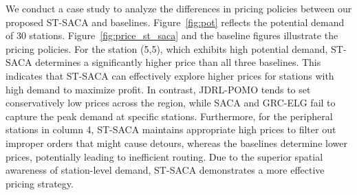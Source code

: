 \documentclass[lettersize,journal]{IEEEtran}
\begin{document}
\color{blue}

We conduct a case study to analyze the differences in pricing policies between our proposed ST-SACA and baselines. Figure~\ref{fig:pot} reflects the potential demand of 30 stations. Figure~\ref{fig:price_st_saca} and the baseline figures illustrate the pricing policies. For the station (5,5), which exhibits high potential demand, ST-SACA determines a significantly higher price than all three baselines. This indicates that ST-SACA can effectively explore higher prices for stations with high demand to maximize profit. In contrast, JDRL-POMO tends to set conservatively low prices across the region, while SACA and GRC-ELG fail to capture the peak demand at specific stations. Furthermore, for the peripheral stations in column 4, ST-SACA maintains appropriate high prices to filter out improper orders that might cause detours, whereas the baselines determine lower prices, potentially leading to inefficient routing. Due to the superior spatial awareness of station-level demand, ST-SACA demonstrates a more effective pricing strategy.




\end{document}
